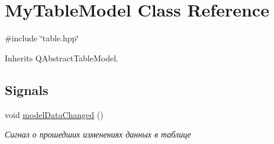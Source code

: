 \hypertarget{class_my_table_model}{}\section{My\+Table\+Model Class Reference}
\label{class_my_table_model}


{\ttfamily \#include \char`\"{}table.\+hpp\char`\"{}}



Inherits Q\+Abstract\+Table\+Model.

\subsection*{Signals}
\begin{DoxyCompactItemize}
\item 
\mbox{\label{class_my_table_model_ad867e15ab08775a1d037a50ada49db8a}} 
void \mbox{\hyperlink{class_my_table_model_ad867e15ab08775a1d037a50ada49db8a}{model\+Data\+Changed}} ()
\begin{DoxyCompactList}\small\item\em Сигнал о прошедших изменениях данных в таблице \end{DoxyCompactList}\end{DoxyCompactItemize}
